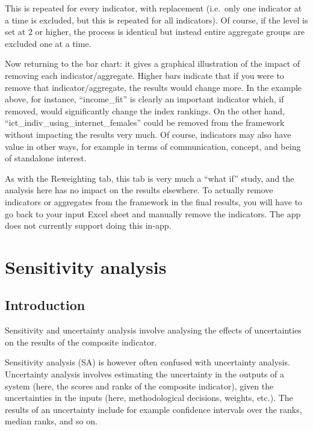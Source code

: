 \documentclass[
  letterpaper,
  DIV=11,
  numbers=noendperiod]{scrreprt}
\begin{document}
This is repeated for every indicator, with replacement (i.e.~only one
indicator at a time is excluded, but this is repeated for all
indicators). Of course, if the level is set at 2 or higher, the process
is identical but instead entire aggregate groups are excluded one at a
time.

Now returning to the bar chart: it gives a graphical illustration of the
impact of removing each indicator/aggregate. Higher bars indicate that
if you were to remove that indicator/aggregate, the results would change
more. In the example above, for instance, ``income\_fit'' is clearly an
important indicator which, if removed, would significantly change the
index rankings. On the other hand,
``ict\_indiv\_using\_internet\_females'' could be removed from the
framework without impacting the results very much. Of course, indicators
may also have value in other ways, for example in terms of
communication, concept, and being of standalone interest.

As with the Reweighting tab, this tab is very much a ``what if'' study,
and the analysis here has no impact on the results elsewhere. To
actually remove indicators or aggregates from the framework in the final
results, you will have to go back to your input Excel sheet and manually
remove the indicators. The app does not currently support doing this
in-app.

\hypertarget{sec-sensitivity}{%
\chapter{Sensitivity analysis}\label{sec-sensitivity}}

\hypertarget{introduction}{%
\section{Introduction}\label{introduction}}

Sensitivity and uncertainty analysis involve analysing the effects of
uncertainties on the results of the composite indicator.

Sensitivity analysis (SA) is however often confused with uncertainty
analysis. Uncertainty analysis involves estimating the uncertainty in
the outputs of a system (here, the scores and ranks of the composite
indicator), given the uncertainties in the inputs (here, methodological
decisions, weights, etc.). The results of an uncertainty include for
example confidence intervals over the ranks, median ranks, and so on.
\end{document}
